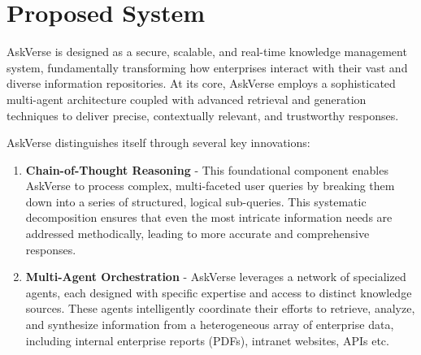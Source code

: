 \documentclass[default]{sn-jnl}%
\begin{document}
\section*{Proposed System}
AskVerse is designed as a secure, scalable, and real-time knowledge management system, fundamentally transforming how enterprises interact with their vast and diverse information repositories. At its core, AskVerse employs a sophisticated multi-agent architecture coupled with advanced retrieval and generation techniques to deliver precise, contextually relevant, and trustworthy responses.

AskVerse distinguishes itself through several key innovations:
\begin{enumerate}
    \item \textbf{Chain-of-Thought Reasoning} - This foundational component enables AskVerse to process complex, multi-faceted user queries by breaking them down into a series of structured, logical sub-queries. This systematic decomposition ensures that even the most intricate information needs are addressed methodically, leading to more accurate and comprehensive responses.
    \item \textbf{Multi-Agent Orchestration} - AskVerse leverages a network of specialized agents, each designed with specific expertise and access to distinct knowledge sources. These agents intelligently coordinate their efforts to retrieve, analyze, and synthesize information from a heterogeneous array of enterprise data, including internal enterprise reports (PDFs), intranet websites, APIs etc.
    

\end{enumerate}
\end{document}
